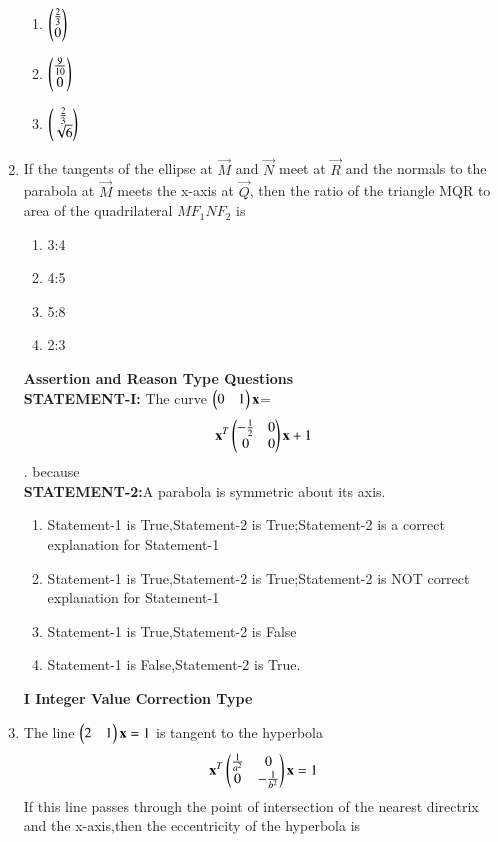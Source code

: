 \documentclass[journal,12pt,twocolumn]{IEEEtran}
\begin{document}
\begin{enumerate}[label=\arabic*]
\begin{enumerate}
    \item $\begin{pmatrix}\frac{2}{3}\\0\end{pmatrix}$
    \item $\begin{pmatrix}\frac{9}{10}\\0\end{pmatrix}$
    \item $\begin{pmatrix}\frac{2}{3}\\\sqrt{6}\end{pmatrix}$
   \end{enumerate}
   \item If the tangents of the ellipse at $\vec{M}$ and $\vec{N}$ meet at $\vec{R}$ and the normals to the parabola at $\vec{M}$ meets the x-axis at $\vec{Q}$, then the ratio of the triangle MQR to area of the quadrilateral $M F_1 N F_2$ is
    \begin{enumerate}
    \item 3:4
    \item 4:5
    \item 5:8
    \item 2:3
   \end{enumerate}
   {\textbf{Assertion and Reason Type Questions}}\\
    \textbf{STATEMENT-I:}
    The curve $\begin{pmatrix}0&1\end{pmatrix}\mathbf{x}$=
    \begin{align}
    \mathbf{x}^T\begin{pmatrix}-\frac{1}{2}&0\\0&0\end{pmatrix}\mathbf{x}+1
    \end{align}. because\\
    \textbf{STATEMENT-2:}A parabola is symmetric about its axis.
    \begin{enumerate}
    \item Statement-1 is True,Statement-2 is True;Statement-2 is a correct explanation for Statement-1
    \item Statement-1 is True,Statement-2 is True;Statement-2 is NOT correct explanation for Statement-1
    \item Statement-1 is True,Statement-2 is False
    \item Statement-1 is False,Statement-2 is True.
    \end{enumerate}
   {\textbf{I   Integer Value Correction Type}}
    \item The line $\begin{pmatrix}2&1\end{pmatrix}\mathbf{x}=1$ is tangent to the hyperbola
    \begin{align}
    \mathbf{x}^T\begin{pmatrix}\frac{1}{a^2}&0\\0&-\frac{1}{b^2}\end{pmatrix}\mathbf{x}=1
    \end{align}
    If this line passes through the point of intersection of the nearest directrix and the x-axis,then the eccentricity of the hyperbola is 

\end{enumerate}
\end{document}
